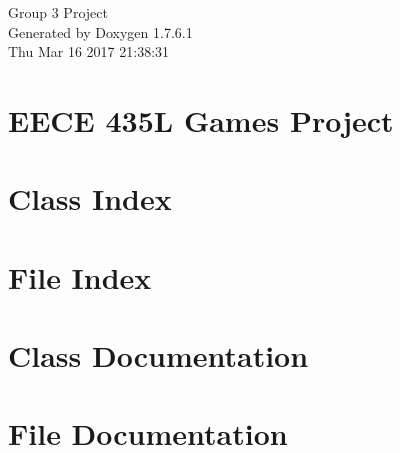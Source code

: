 \documentclass[a4paper]{book}
\begin{document}
\hypersetup{pageanchor=false,citecolor=blue}
\begin{titlepage}
\vspace*{7cm}
\begin{center}
{\Large \-Group 3 \-Project }\\
\vspace*{1cm}
{\large \-Generated by Doxygen 1.7.6.1}\\
\vspace*{0.5cm}
{\small Thu Mar 16 2017 21:38:31}\\
\end{center}
\end{titlepage}
\clearemptydoublepage
{}
\tableofcontents
\clearemptydoublepage
{}
\hypersetup{pageanchor=true,citecolor=blue}
\chapter{\-E\-E\-C\-E 435\-L \-Games \-Project}
\label{index}\hypertarget{index}{}
\chapter{\-Class \-Index}

\chapter{\-File \-Index}

\chapter{\-Class \-Documentation}















\chapter{\-File \-Documentation}






























\printindex
\end{document}
